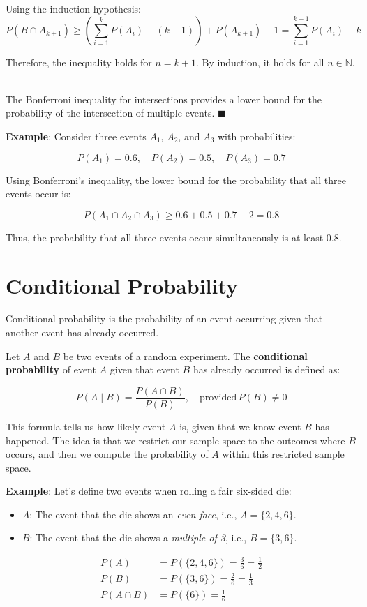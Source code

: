 \documentclass[twoside]{book}
\begin{document}
Using the induction hypothesis:
\[
P(B \cap A_{k+1}) \geq \left( \sum_{i=1}^{k} P(A_i) - (k - 1) \right) + P(A_{k+1}) - 1 = \sum_{i=1}^{k+1} P(A_i) - k
\]

Therefore, the inequality holds for \( n = k + 1 \). By induction, it holds for all \( n \in \mathbb{N} \). \

The Bonferroni inequality for intersections provides a lower bound for the probability of the intersection of multiple events. 
\hfill\(\blacksquare\)

\textbf{Example}: Consider three events \( A_1 \), \( A_2 \), and \( A_3 \) with probabilities:

\[
P(A_1) = 0.6, \quad P(A_2) = 0.5, \quad P(A_3) = 0.7
\]

Using Bonferroni’s inequality, the lower bound for the probability that all three events occur is:

\[
P(A_1 \cap A_2 \cap A_3) \geq 0.6 + 0.5 + 0.7 - 2 = 0.8
\]

Thus, the probability that all three events occur simultaneously is at least \( 0.8 \).


\section{Conditional Probability}

Conditional probability is the probability of an event occurring given that another event has already occurred.

\begin{textbox}
    Let $A$ and $B$ be two events of a random experiment. The \textbf{conditional probability} of event \( A \) given that event \( B \) has already occurred is defined as:

\[
P(A \mid B) = \frac{P(A \cap B)}{P(B)}, \quad \text{provided} \, P(B) \neq 0
\]
\end{textbox}

This formula tells us how likely event \( A \) is, given that we know event \( B \) has happened. The idea is that we restrict our sample space to the outcomes where \( B \) occurs, and then we compute the probability of \( A \) within this restricted sample space.

\textbf{Example}: Let's define two events when rolling a fair six-sided die:

\begin{itemize}
    \item \( A \): The event that the die shows an \textit{even face}, i.e., \( A = \{2, 4, 6\} \).
    \item \( B \): The event that the die shows a \textit{multiple of 3}, i.e., \( B = \{3, 6\} \).
\end{itemize}
\begin{align*}
    P(A) &= P(\{2, 4, 6\})= \frac{3}{6} = \frac{1}{2} \\
    P(B) &= P(\{3, 6\})=  \frac{2}{6} = \frac{1}{3} \\
    P(A \cap B) &= P(\{6\}) = \frac{1}{6}
\end{align*}
\end{document}
